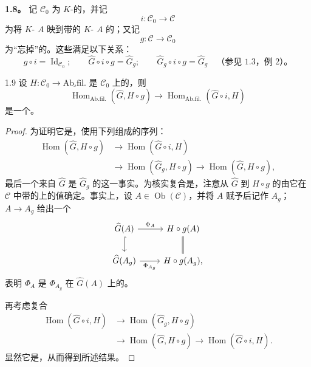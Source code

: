 \textbf{1.8。} 记 $\mathscr C_0$ 为 $K$-的，并记
\[
i:\mathscr C_0\longrightarrow\mathscr C
\]
为将 $K$- $A$ 映到带的 $K$- $A$ 的；又记
\[
g:\mathscr C\longrightarrow\mathscr C_0
\]
为“忘掉”的。这些满足以下关系：
\[
g\circ i=\operatorname{Id}_{\mathscr C_0};\qquad
\widehat G\circ i\circ g=\widehat G_g;\qquad
\widehat G_g\circ i\circ g=\widehat G_g
\quad\text{（参见 1.3，例 2）。}
\]

\begin{SGAresult}{}{1.9}
设 $H:\mathscr C_0\longrightarrow\underline{\mathrm{Ab.fil.}}$ 是 $\mathscr C_0$ 上的，则
\[
\operatorname{Hom}_{\mathrm{Ab.fil.}}(\widehat G,H\circ g)
\longrightarrow
\operatorname{Hom}_{\mathrm{Ab.fil.}}(\widehat G\circ i,H)
\]
是一个。
\end{SGAresult}
\begin{proof}
为证明它是，使用下列组成的序列：
\[
\begin{aligned}
\operatorname{Hom}(\widehat G,H\circ g)
&\longrightarrow\operatorname{Hom}(\widehat G\circ i,H)\\
&\longrightarrow\operatorname{Hom}(\widehat G_g,H\circ g)
\longrightarrow\operatorname{Hom}(\widehat G,H\circ g),
\end{aligned}
\]
最后一个来自 $\widehat G$ 是 $\widehat G_g$ 的这一事实。为核实复合是，注意从 $\widehat G$ 到 $H\circ g$ 的由它在 $\mathscr C$ 中带的上的值确定。事实上，设 $A\in\operatorname{Ob}(\mathscr C)$，并将 $A$ 赋予后记作 $A_g$； $A\longrightarrow A_g$ 给出一个
\[
\begin{tikzcd}
\widehat G(A)\arrow[r,"\Phi_A"]\arrow[d,hook] &
H\circ g(A)\arrow[d,equal]\\
\widehat G(A_g)\arrow[r,"\Phi_{A_g}"'] & H\circ g(A_g),
\end{tikzcd}
\]
表明 $\Phi_A$ 是 $\Phi_{A_g}$ 在 $\widehat G(A)$ 上的。

再考虑复合
\[
\begin{aligned}
\operatorname{Hom}(\widehat G\circ i,H)
&\longrightarrow\operatorname{Hom}(\widehat G_g,H\circ g)\\
&\longrightarrow\operatorname{Hom}(\widehat G,H\circ g)
\longrightarrow\operatorname{Hom}(\widehat G\circ i,H).
\end{aligned}
\]
显然它是，从而得到所述结果。
\end{proof}

